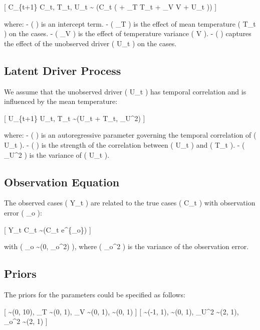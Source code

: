 \documentclass[
  letterpaper,
  DIV=11,
  numbers=noendperiod]{scrartcl}
\begin{document}
{[} C\_\{t+1\} \mid C\_t, T\_t, U\_t \sim {} \left(C\_t
\exp \left( \alpha + \beta\_T T\_t + \beta\_V V + \gamma U\_t
\right)\right) {]}

where: - ( \alpha ) is an intercept term. - ( \beta\_T ) is the effect
of mean temperature ( T\_t ) on the cases. - ( \beta\_V ) is the effect
of temperature variance ( V ). - ( \gamma ) captures the effect of the
unobserved driver ( U\_t ) on the cases.

\subsection{Latent Driver Process}\label{latent-driver-process}

We assume that the unobserved driver ( U\_t ) has temporal correlation
and is influenced by the mean temperature:

{[} U\_\{t+1\} \mid U\_t, T\_t \sim {}(\phi U\_t + \eta T\_t,
\sigma\_U\^{}2) {]}

where: - ( \phi ) is an autoregressive parameter governing the temporal
correlation of ( U\_t ). - ( \eta ) is the strength of the correlation
between ( U\_t ) and ( T\_t ). - ( \sigma\_U\^{}2 ) is the variance of (
U\_t ).

\subsection{Observation Equation}\label{observation-equation}

The observed cases ( Y\_t ) are related to the true cases ( C\_t ) with
observation error ( \epsilon\_o ):

{[} Y\_t \mid C\_t \sim {}(C\_t e\^{}\{\epsilon\_o\}) {]}

with ( \epsilon\_o \sim {}(0, \sigma\_o\^{}2) ), where (
\sigma\_o\^{}2 ) is the variance of the observation error.

\subsection{Priors}\label{priors}

The priors for the parameters could be specified as follows:

{[} \alpha \sim {}(0, 10), \quad \beta\_T \sim {}(0,
1), \quad \beta\_V \sim {}(0, 1),
\quad \gamma \sim {}(0, 1) {]} {[} \phi \sim {}(-1,
1), \quad \eta \sim {}(0, 1), \quad \sigma\_U\^{}2
\sim {}(2, 1), \quad \sigma\_o\^{}2
\sim {}(2, 1) {]}
\end{document}
